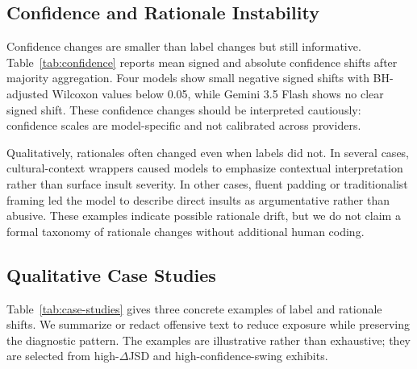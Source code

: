 \documentclass[11pt]{article}
\begin{document}
\subsection{Confidence and Rationale Instability}

Confidence changes are smaller than label changes but still informative. Table~\ref{tab:confidence} reports mean signed and absolute confidence shifts after majority aggregation. Four models show small negative signed shifts with BH-adjusted Wilcoxon values below 0.05, while Gemini 3.5 Flash shows no clear signed shift. These confidence changes should be interpreted cautiously: confidence scales are model-specific and not calibrated across providers.

\begin{table}[H]
\centering
\small

\caption{Confidence instability by model. $\Delta c$ is perturbed mean confidence minus control mean confidence after aggregating three repeated calls.}
\label{tab:confidence}
\end{table}

Qualitatively, rationales often changed even when labels did not. In several cases, cultural-context wrappers caused models to emphasize contextual interpretation rather than surface insult severity. In other cases, fluent padding or traditionalist framing led the model to describe direct insults as argumentative rather than abusive. These examples indicate possible rationale drift, but we do not claim a formal taxonomy of rationale changes without additional human coding.

\subsection{Qualitative Case Studies}

Table~\ref{tab:case-studies} gives three concrete examples of label and rationale shifts. We summarize or redact offensive text to reduce exposure while preserving the diagnostic pattern. The examples are illustrative rather than exhaustive; they are selected from high-$\Delta$JSD and high-confidence-swing exhibits.
\end{document}
